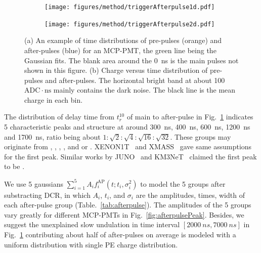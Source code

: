 \begin{figure}[!htbp]
    \centering
    \begin{subfigure}[t]{\LF\textwidth}
        \texttt{[image: figures/method/triggerAfterpulse1d.pdf]}
        \caption{}%
        \label{fig:afterpulse1d}
    \end{subfigure}
    \begin{subfigure}[t]{\LF\textwidth}
        \texttt{[image: figures/method/triggerAfterpulse2d.pdf]}
        \caption{}
        \label{fig:afterpulse2d}
    \end{subfigure}
    \caption{(a) An example of time distributions of pre-pulses (orange) and after-pulses (blue) for an MCP-PMT, the green line being the Gaussian fits. The blank area around the \SI{0}{ns} is the main pulses not shown in this figure. (b) Charge versus time distribution of pre-pulses and after-pulses. The horizontal bright band at about 100\,$\mathrm{ADC}\cdot \mathrm{ns}$ mainly contains the dark noise. The black line is the mean charge in each bin.}
\end{figure}

The distribution of delay time from $t_r^{10}$ of main to after-pulse in Fig.~\ref{fig:afterpulse1d} indicates 5 characteristic peaks and structure at around \SI{300}{ns}, \SI{400}{ns}, \SI{600}{ns}, \SI{1200}{ns} and \SI{1700}{ns}, ratio being about $1:\sqrt{2}:\sqrt{4}:\sqrt{16}:\sqrt{32}$. These groups may originate from , , , , and  or . XENON1T~\cite{XENON1TTesting} and XMASS~\cite{Abe_2020} gave same assumptions for the first peak. Similar works by JUNO~\cite{Zhao:2022gks} and KM3NeT~\cite{KM3NetTesting} claimed the first peak to be .

We use 5 gaussians $\sum_{i=1}^{5}{A_if_i^{\mathrm{AP}}(t;t_i,\sigma_i^2)}$ to model the 5 groups after substracting DCR, in which $A_i$, $t_i$, and $\sigma_i$ are the amplitudes, times, width of each after-pulse group (Table.~\ref{tab:afterpulse}). The amplitudes of the 5 groups vary greatly for different MCP-PMTs in Fig.~\ref{fig:afterpulsePeak}. Besides, we suggest the unexplained slow undulation in time interval $[\SI{2000}{ns},\SI{7000}{ns}]$ in Fig.~\ref{fig:afterpulse1d} contributing about half of after-pulses on average is modeled with a uniform distribution with single PE charge distribution.

